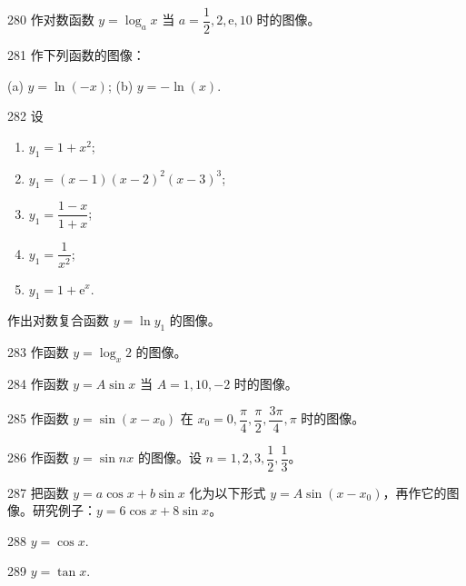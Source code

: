 \begin{prob}[M]{280}
作对数函数 $y = \log_a x$ 当 $a = \dfrac{1}{2}, 2, \mathrm{e}, 10$ 时的图像。
\end{prob}

\begin{prob}[M]{281}
作下列函数的图像：

(a) $y = \ln(-x)$; \qquad (b) $y = -\ln(x)$.
\end{prob}

\begin{prob}[L]{282}
设
\begin{enumerate}[label=(\alph*), itemsep=2pt, topsep=3pt]
  \item $y_1 = 1 + x^2$;
  \item $y_1 = (x - 1)(x - 2)^2(x - 3)^3$;
  \item $y_1 = \dfrac{1 - x}{1 + x}$;
  \item $y_1 = \dfrac{1}{x^2}$;
  \item $y_1 = 1 + \mathrm{e}^x$.
\end{enumerate}
作出对数复合函数 $y = \ln y_1$ 的图像。
\end{prob}

\begin{prob}[S]{283}
作函数 $y = \log_x 2$ 的图像。
\end{prob}

\begin{prob}[S]{284}
作函数 $y = A\sin x$ 当 $A = 1, 10, -2$ 时的图像。
\end{prob}

\begin{prob}[M]{285}
作函数 $y = \sin(x - x_0)$ 在 $x_0 = 0, \dfrac{\pi}{4}, \dfrac{\pi}{2}, \dfrac{3\pi}{4}, \pi$ 时的图像。
\end{prob}

\begin{prob}[M]{286}
作函数 $y = \sin nx$ 的图像。设 $n = 1, 2, 3, \dfrac{1}{2}, \dfrac{1}{3}$。
\end{prob}

\begin{prob}[M]{287}
把函数 $y = a\cos x + b\sin x$ 化为以下形式 $y = A\sin(x - x_0)$，再作它的图像。研究例子：$y = 6\cos x + 8\sin x$。
\end{prob}


\begin{prob}[S]{288}
$y = \cos x$.
\end{prob}

\begin{prob}[S]{289}
$y = \tan x$.
\end{prob}

